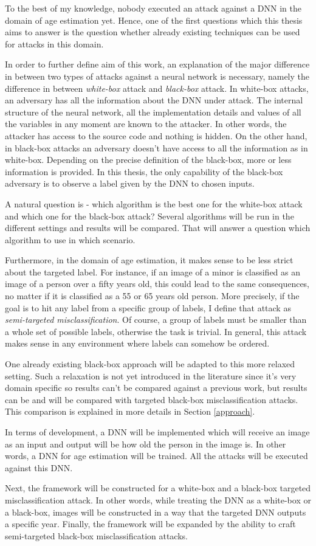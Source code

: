 To the best of my knowledge, nobody executed an attack against a DNN in the domain of age estimation yet. Hence, one of the first questions which this thesis aims to answer is the question whether already existing techniques can be used for attacks in this domain.

In order to further define aim of this work, an explanation of the major difference in between two types of attacks against a neural network is necessary, namely the difference in between \textit{white-box} attack and \textit{black-box} attack. 
In white-box attacks, an adversary has all the information about the DNN under attack. The internal structure of the neural network, all the implementation details and values of all the variables in any moment are known to the attacker. In other words, the attacker has access to the source code and nothing is hidden.
On the other hand, in black-box attacks an adversary doesn't have access to all the information as in white-box. Depending on the precise definition of the black-box, more or less information is provided. In this thesis, the only capability of the black-box adversary is to observe a label given by the DNN to chosen inputs.

A natural question is - which algorithm is the best one for the white-box attack and which one for the black-box attack? Several algorithms will be run in the different settings and results will be compared. That will answer a question which algorithm to use in which scenario.

Furthermore, in the domain of age estimation, it makes sense to be less strict about the targeted label. For instance, if an image of a minor is classified as an image of a person over a fifty years old, this could lead to the same consequences, no matter if it is classified as a 55 or 65 years old person. More precisely, if the goal is to hit any label from a specific group of labels, I define that attack as \textit{semi-targeted misclassification}. Of course, a group of labels must be smaller than a whole set of possible labels, otherwise the task is trivial. In general, this attack makes sense in any environment where labels can somehow be ordered.

One already existing black-box approach will be adapted to this more relaxed setting. Such a relaxation is not yet introduced in the literature since it's very domain specific so results can't be compared against a previous work, but results can be and will be compared with targeted black-box misclassification attacks. This comparison is explained in more details in Section \ref{approach}. 

In terms of development, a DNN will be implemented which will receive an image as an input and output will be how old the person in the image is. In other words, a DNN for age estimation will be trained. All the attacks will be executed against this DNN. 

Next, the framework will be constructed for a white-box and a black-box targeted misclassification attack. In other words, while treating the DNN as a white-box or a black-box, images will be constructed in a way that the targeted DNN outputs a specific year. Finally, the framework will be expanded by the ability to craft semi-targeted black-box misclassification attacks.